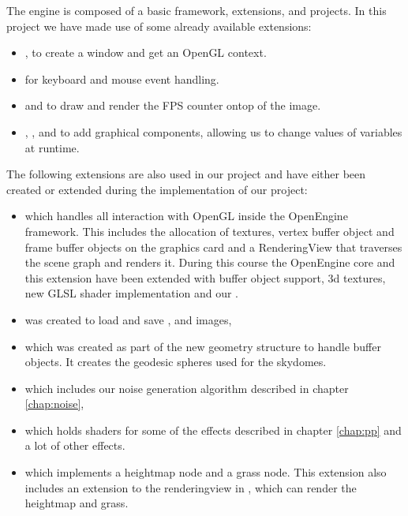 The engine is composed of a basic framework, extensions, and
projects. In this project we have made use of some already available
extensions:

\begin{itemize}
  \item {}, to create a window and get an OpenGL context.
  \item {} for keyboard and mouse event handling.
  \item {} and  to draw and render the FPS
    counter ontop of the image.
  \item {}, , and
     to add graphical components, allowing us to
    change values of variables at runtime.
\end{itemize}

The following extensions are also used in our project and have either
been created or extended during the implementation of our project:

\begin{itemize}
  \item {} which handles all interaction with
    OpenGL inside the OpenEngine framework. This includes the
    allocation of textures, vertex buffer object and frame buffer
    objects on the graphics card and a RenderingView that traverses
    the scene graph and renders it. During this course the OpenEngine
    core and this extension have been extended with buffer object
    support, 3d textures, new GLSL shader implementation and our
    .
  \item {} was created to load and save ,
     and  images,
  \item {} which was created as part of the new geometry
    structure to handle  buffer objects. It creates the geodesic
    spheres used for the skydomes.
  \item {} which includes our noise generation algorithm
    described in chapter \ref{chap:noise},
  \item {} which holds shaders for
    some of the effects described in chapter \ref{chap:pp} and a lot
    of other effects.
  \item {} which implements a heightmap node and a grass
    node. This extension also includes an extension to the
    renderingview in , which can render the
    heightmap and grass.
\end{itemize}

